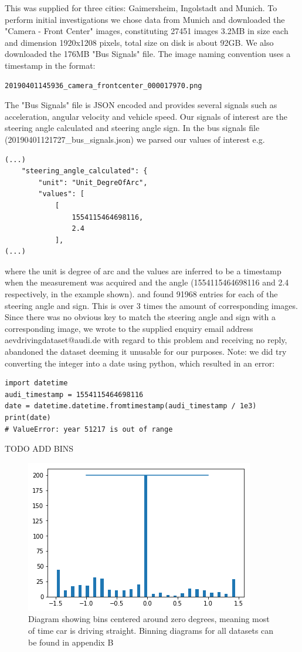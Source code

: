 This was supplied for three cities: Gaimersheim, Ingolstadt and Munich. To perform initial investigations we chose data from Munich and downloaded the "Camera - Front Center" images, constituting 27451 images 3.2MB in size each and dimension 1920x1208 pixels, total size on disk is about 92GB. We also downloaded the 176MB "Bus Signals" file. The image naming convention uses a timestamp in the format:
\begin{verbatim}
20190401145936_camera_frontcenter_000017970.png
\end{verbatim}
The "Bus Signals" file is JSON encoded and provides several signals such as acceleration, angular velocity and vehicle speed. Our signals of interest are the steering angle calculated and steering angle sign. In the bus signals file (20190401121727\_bus\_signals.json) we parsed our values of interest e.g.
\begin{verbatim}
(...)
    "steering_angle_calculated": {
        "unit": "Unit_DegreOfArc",
        "values": [
            [
                1554115464698116,
                2.4
            ],
(...)
\end{verbatim}
where the unit is degree of arc and the values are inferred to be a timestamp when the measurement was acquired and the angle (1554115464698116 and 2.4 respectively, in the example shown).
and found 91968 entries for each of the steering angle and sign. This is over 3 times the amount of corresponding images. Since there was no obvious key to match the steering angle and sign with a corresponding image, we wrote to the supplied enquiry email address aevdrivingdataset@audi.de with regard to this problem and receiving no reply, abandoned the dataset deeming it unusable for our purposes.  
Note: we did try converting the integer into a date using python, which resulted in an error:
\begin{verbatim}
import datetime
audi_timestamp = 1554115464698116
date = datetime.datetime.fromtimestamp(audi_timestamp / 1e3)
print(date)
# ValueError: year 51217 is out of range    
\end{verbatim}

TODO ADD BINS
\begin{figure}[ht]
 \centering 
 \includegraphics[scale=1]{Figures/bins.png}
 \caption{Diagram showing bins centered around zero degrees, meaning most of time car is driving straight. Binning diagrams for all datasets can be found in appendix B}
 \label{fig:bins-placeholder}
\end{figure}

